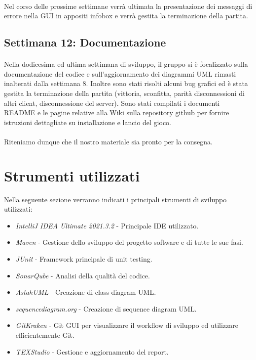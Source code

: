 \documentclass[a4paper, 12pt]{article}
\begin{document}
	\paragraph{}
	Nel corso delle prossime settimane verrà ultimata la presentazione dei messaggi di errore nella GUI in appositi infobox e verrà gestita la terminazione della partita.
	
	\subsection{Settimana 12: Documentazione}
	\paragraph{}
	Nella dodicesima ed ultima settimana di sviluppo, il gruppo si è focalizzato sulla documentazione del codice e sull'aggiornamento dei diagrammi UML rimasti inalterati dalla settimana 8. Inoltre sono stati risolti alcuni bug grafici ed è stata gestita la terminazione della partita (vittoria, sconfitta, parità disconnessioni di altri client, disconnessione del server). Sono stati compilati i documenti README e le pagine relative alla Wiki sulla repository github per fornire istruzioni dettagliate su installazione e lancio del gioco.
	\paragraph{}
	Riteniamo dunque che il nostro materiale sia pronto per la consegna.
	
	\newpage
	\section{Strumenti utilizzati}
	Nella seguente sezione verranno indicati i principali strumenti di sviluppo utilizzati:\\
	\begin{itemize}
		\setlength{\parskip}{0pt}
		\setlength{\parsep}{0pt}
		
		\item \emph{IntelliJ IDEA Ultimate 2021.3.2} - Principale IDE utilizzato.
		\item \emph{Maven} - Gestione dello sviluppo del progetto software e di tutte le sue fasi.
		\item \emph{JUnit} - Framework principale di unit testing.
		\item \emph{SonarQube} - Analisi della qualità del codice.
		\item \emph{AstahUML} - Creazione di class diagram UML.
		\item \emph{sequencediagram.org} - Creazione di sequence diagram UML.
		\item \emph{GitKraken} - Git GUI per visualizzare il workflow di sviluppo ed utilizzare efficientemente Git.
		\item \emph{TEXStudio} - Gestione e aggiornamento del report.
	\end{itemize}
\end{document}
